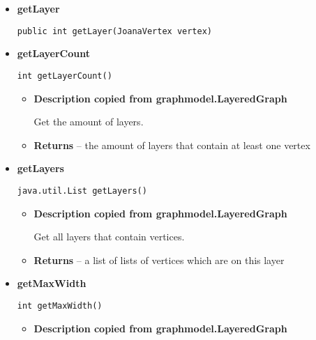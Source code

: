 {{{{{{{{{{{{{\begin{itemize}
{\begin{itemize}
{Get all vertices from a certain layer.
}
\item{
{\bf  Parameters}
  \begin{itemize}
   \item{
\texttt{layerN} -- the index of the layer}
  \end{itemize}
}%
\item{{\bf  Returns} -- 
a list of all vertices which are on this layer 
}%
\end{itemize}
}%
\item{ 
{\bf  getLayer}\\
\begin{lstlisting}[frame=none]
public int getLayer(JoanaVertex vertex)\end{lstlisting} %
}%
\item{ 
{\bf  getLayerCount}\\
\begin{lstlisting}[frame=none]
int getLayerCount()\end{lstlisting} %
\begin{itemize}
\item{
{\bf  Description copied from graphmodel.LayeredGraph{\small {}} }

Get the amount of layers.
}
\item{{\bf  Returns} -- 
the amount of layers that contain at least one vertex 
}%
\end{itemize}
}%
\item{ 
{\bf  getLayers}\\
\begin{lstlisting}[frame=none]
java.util.List getLayers()\end{lstlisting} %
\begin{itemize}
\item{
{\bf  Description copied from graphmodel.LayeredGraph{\small {}} }

Get all layers that contain vertices.
}
\item{{\bf  Returns} -- 
a list of lists of vertices which are on this layer 
}%
\end{itemize}
}%
\item{ 
{\bf  getMaxWidth}\\
\begin{lstlisting}[frame=none]
int getMaxWidth()\end{lstlisting} %
\begin{itemize}
\item{
{\bf  Description copied from graphmodel.LayeredGraph{\small {}} }

}
\end{itemize}}
\end{itemize}}}}}}}}}}}}}}
